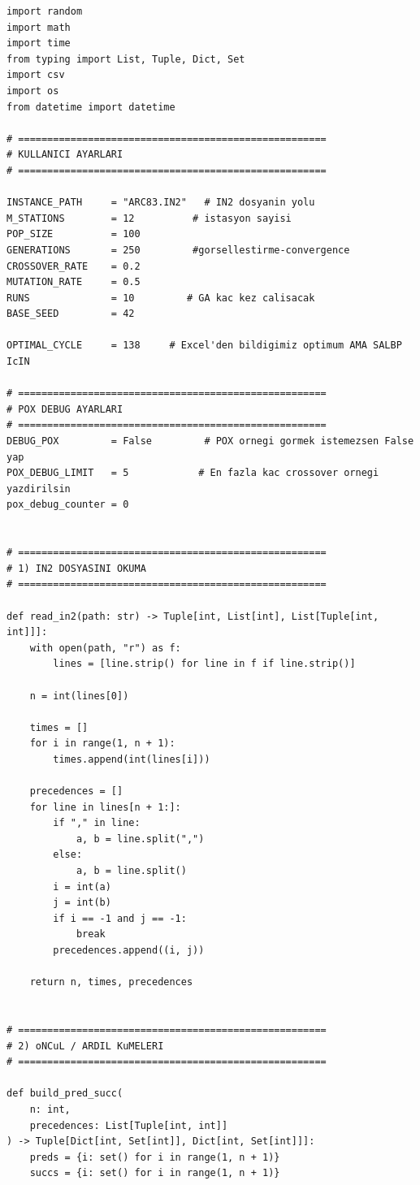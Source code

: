 \documentclass[12pt,a4paper]{article}
\begin{document}
\begin{lstlisting}[style=atomone,
caption={Python implementation of the genetic algorithm for the U-shaped assembly line balancing problem (UALBP-II) on the ARC83 instance.},
label={lst:ga-arc83-full}]
import random
import math
import time
from typing import List, Tuple, Dict, Set
import csv
import os
from datetime import datetime

# =====================================================
# KULLANICI AYARLARI
# =====================================================

INSTANCE_PATH     = "ARC83.IN2"   # IN2 dosyanin yolu
M_STATIONS        = 12          # istasyon sayisi
POP_SIZE          = 100
GENERATIONS       = 250         #gorsellestirme-convergence
CROSSOVER_RATE    = 0.2
MUTATION_RATE     = 0.5
RUNS              = 10         # GA kac kez calisacak
BASE_SEED         = 42

OPTIMAL_CYCLE     = 138     # Excel'den bildigimiz optimum AMA SALBP IcIN

# =====================================================
# POX DEBUG AYARLARI
# =====================================================
DEBUG_POX         = False         # POX ornegi gormek istemezsen False yap
POX_DEBUG_LIMIT   = 5            # En fazla kac crossover ornegi yazdirilsin
pox_debug_counter = 0


# =====================================================
# 1) IN2 DOSYASINI OKUMA
# =====================================================

def read_in2(path: str) -> Tuple[int, List[int], List[Tuple[int, int]]]:
    with open(path, "r") as f:
        lines = [line.strip() for line in f if line.strip()]

    n = int(lines[0])

    times = []
    for i in range(1, n + 1):
        times.append(int(lines[i]))

    precedences = []
    for line in lines[n + 1:]:
        if "," in line:
            a, b = line.split(",")
        else:
            a, b = line.split()
        i = int(a)
        j = int(b)
        if i == -1 and j == -1:
            break
        precedences.append((i, j))

    return n, times, precedences


# =====================================================
# 2) oNCuL / ARDIL KuMELERI
# =====================================================

def build_pred_succ(
    n: int,
    precedences: List[Tuple[int, int]]
) -> Tuple[Dict[int, Set[int]], Dict[int, Set[int]]]:
    preds = {i: set() for i in range(1, n + 1)}
    succs = {i: set() for i in range(1, n + 1)}


\end{lstlisting}
\end{document}

